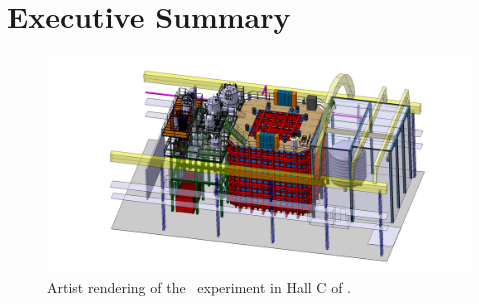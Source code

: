 \section{Executive Summary}
\label{sec:ExecutiveSummary}


\vspace{1cm}

\begin{figure}[t!]
\vspace*{-3cm}\includegraphics[width=1.5\textwidth, angle=270]{./Figures/assembly_sequence_11_07/58.png}
\caption[Artist rendering of the \DSks\ experiment in Hall C of \LNGS]{Artist rendering of the \DSks\ experiment in Hall C of \LNGS.}
\label{fig:Overall-Design}
\end{figure}

